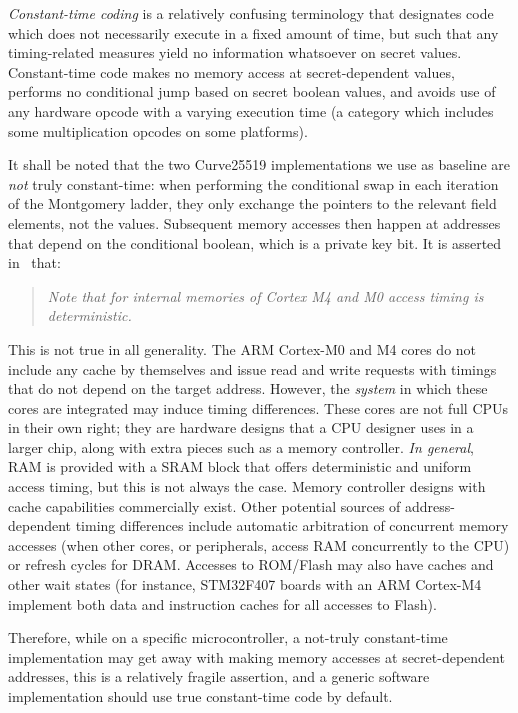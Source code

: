 \documentclass{llncs}
\begin{document}
\emph{Constant-time coding} is a relatively confusing terminology that
designates code which does not necessarily execute in a fixed amount of
time, but such that any timing-related measures yield no information
whatsoever on secret values. Constant-time code makes no memory access
at secret-dependent values, performs no conditional jump based on secret
boolean values, and avoids use of any hardware opcode with a varying
execution time (a category which includes some multiplication opcodes on
some platforms\cite{BearSSLctmul}).

It shall be noted that the two Curve25519 implementations we use as
baseline are \emph{not} truly constant-time: when performing the
conditional swap in each iteration of the Montgomery ladder, they only
exchange the pointers to the relevant field elements, not the values.
Subsequent memory accesses then happen at addresses that depend on the
conditional boolean, which is a private key bit. It is asserted
in~\cite{HaaLab2019} that:
    \begin{quote}
    \emph{Note that for internal memories of Cortex M4 and M0 access
    timing is deterministic.}
    \end{quote}
This is not true in all generality. The ARM Cortex-M0 and M4 cores do
not include any cache by themselves and issue read and write requests
with timings that do not depend on the target address. However, the
\emph{system} in which these cores are integrated may induce timing
differences. These cores are not full CPUs in their own right; they are
hardware designs that a CPU designer uses in a larger chip, along with
extra pieces such as a memory controller. \emph{In general}, RAM is
provided with a SRAM block that offers deterministic and uniform access
timing, but this is not always the case. Memory controller designs with
cache capabilities commercially exist\cite{CastCacheCtrl}. Other
potential sources of address-dependent timing differences include
automatic arbitration of concurrent memory accesses (when other cores,
or peripherals, access RAM concurrently to the CPU) or refresh cycles
for DRAM. Accesses to ROM/Flash may also have caches and other wait
states (for instance, STM32F407 boards with an ARM Cortex-M4 implement
both data and instruction caches for all accesses to Flash).

Therefore, while on a specific microcontroller, a not-truly
constant-time implementation may get away with making memory accesses at
secret-dependent addresses, this is a relatively fragile assertion, and
a generic software implementation should use true constant-time code by
default.
\end{document}
